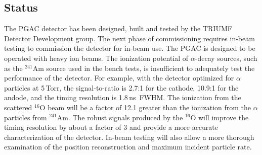 \subsection{Status}
The PGAC detector has been designed, built and tested by the TRIUMF Detector Development group.  The next phase of commissioning requires in-beam testing to commission the detector for in-beam use. %
The PGAC is designed to be operated with heavy ion beams.  The ionization potential of $\alpha$-decay sources, such as the $^{241}$Am source used in the bench tests,  is insufficient to adequately test the performance of the detector.  For example, with the detector optimized for $\alpha$ particles at 5\,Torr, the signal-to-ratio is %
2.7:1  for the cathode, 10.9:1 for the andode,
 and the timing resolution is 1.8\,ns~FWHM.  %
The ionization from the scattered $^{16}$O beam will be a factor of 12.1 greater than the ionization from the $\alpha$ particles from $^{241}$Am. The robust signals produced by the $^{16}$O will improve the timing resolution by about a factor of 3 and provide a more accurate characterization of the detector.  In-beam testing will also allow a more thorough examination of the position reconstruction and 
maximum incident particle rate.

